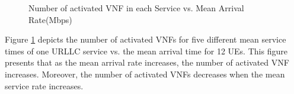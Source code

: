 \documentclass[lettersize,journal]{IEEEtran}
\begin{document}
\begin{figure}
\begin{minipage}[b]{0.4\textwidth}
  \caption{Number of activated VNF in each Service vs. Mean Arrival Rate(Mbps)}
  \label{fig:4}
  \end{minipage}
\end{figure}
Figure \ref{fig:4} depicts the number of activated VNFs for five different mean service times of one URLLC service vs. the mean arrival time for 12 UEs. This figure presents that as the mean arrival rate increases, the number of activated VNF increases. Moreover, the number of activated VNFs decreases when the mean service rate increases.
\end{document}
